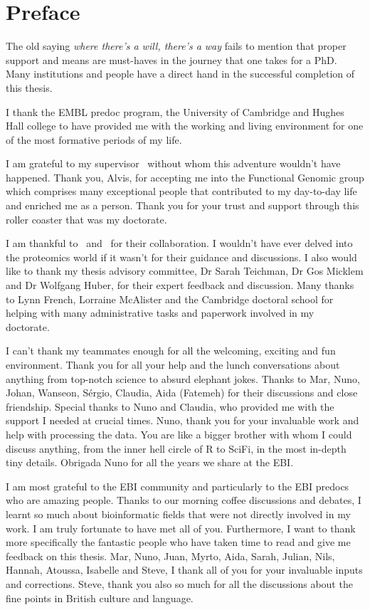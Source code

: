 \chapter*{Preface}
\label{ch:acknowledgements}
\vspace{-1cm}
The old saying \emph{where there's a will, there's a way} fails to mention that
proper support and means are must-haves in the journey that one takes for a PhD.
Many institutions and people have
a direct hand in the successful completion of this thesis.

I thank the EMBL predoc program, the University of Cambridge
and Hughes Hall college to have provided me
with the working and living environment
for one of the most formative periods of my life.

I am grateful to my supervisor \alvis\
without whom this adventure wouldn't have happened.
Thank you, Alvis, for accepting me into the Functional Genomic group
which comprises many exceptional people
that contributed to my day-to-day life and enriched me as a person.
Thank you for your trust and support
through this roller coaster that was my doctorate.

I am thankful to \jyoti\ and \james\ for their collaboration.
I wouldn't have ever delved into the proteomics world
if it wasn't for their guidance and discussions.
I also would like to thank my thesis advisory committee,
Dr Sarah Teichman, Dr Gos Micklem and Dr Wolfgang Huber,
for their expert feedback and discussion.
Many thanks to Lynn French, Lorraine McAlister and the Cambridge doctoral school
for helping with many administrative tasks and paperwork involved in my doctorate.\mybr\

I can't thank my teammates enough for all the welcoming,
exciting and fun environment.
Thank you for all your help and the lunch conversations about anything
from top-notch science to absurd elephant jokes.
Thanks to Mar, Nuno, Johan, Wanseon, Sérgio, Claudia, Aida (Fatemeh)
for their discussions and close friendship.
Special thanks to Nuno and Claudia,
who provided me with the support I needed at crucial times.
Nuno, thank you for your invaluable work and help with processing the data.
You are like a bigger brother with whom I could discuss anything,
from the inner hell circle of R to SciFi, in the most in-depth tiny details.
Obrigada Nuno for all the years we share at the EBI.\@

I am most grateful to the EBI community and
particularly to the EBI predocs who are amazing people.
Thanks to our morning coffee discussions and debates,
I learnt so much about bioinformatic fields that
were not directly involved in my work.
I am truly fortunate to have met all of you.
Furthermore, I want to thank more specifically the fantastic people
who have taken time to read and give me feedback on this thesis.
Mar, Nuno, Juan, Myrto, Aida, Sarah, Julian, Nils,
Hannah, Atoussa, Isabelle and Steve,
I thank all of you for your invaluable inputs and corrections.
Steve, thank you also so much for all the discussions
about the fine points in British culture and language.

